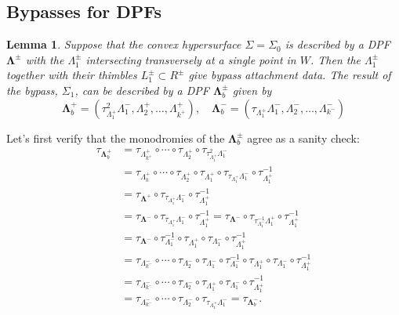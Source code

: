 \documentclass[11pt]{amsart}
\newcommand{\thicc}[1]{\pmb{#1}}
\newcommand{\posNegRegion}{R^{\pm}}
\newcommand{\Lag}{L}
\newcommand{\posNegLag}{\Lag^{\pm}}
\newcommand{\Leg}{\Lambda}
\newcommand{\posLeg}{\Leg^{+}}
\newcommand{\negLeg}{\Leg^{-}}
\newcommand{\thiccPosLeg}{\thicc{\Leg}^{+}}
\newcommand{\thiccNegLeg}{\thicc{\Leg}^{-}}
\newcommand{\thiccPosNegLeg}{\thicc{\Leg}^{\pm}}
\newcommand{\posNegLeg}{\Leg^{\pm}}
\newtheorem{lemma}[thm]{Lemma}
\begin{document}
\subsection{Bypasses for DPFs}

\begin{lemma}\label{Lemma:OBBypass}
Suppose that the convex hypersurface $\Sigma = \Sigma_{0}$ is described by a DPF $\thiccPosNegLeg$ with the $\posNegLeg_{1}$ intersecting transversely at a single point in $W$. Then the $\posNegLeg_{1}$ together with their thimbles $\posNegLag_{1} \subset \posNegRegion$ give bypass attachment data. The result of the bypass, $\Sigma_{1}$, can be described by a DPF $\thiccPosNegLeg_{b}$ given by
\begin{equation*}
\thiccPosLeg_{b} = (\tau_{\posLeg_{1}}^{2}\negLeg_{1}, \posLeg_{2}, \dots, \posLeg_{k^{+}}), \quad \thiccNegLeg_{b} = (\tau_{\posLeg_{1}}\negLeg_{1}, \negLeg_{2}, \dots, \negLeg_{k^{-}})
\end{equation*}
\end{lemma}

Let's first verify that the monodromies of the $\thiccPosNegLeg_{b}$ agree as a sanity check:
\begin{equation*}
\begin{aligned}
\tau_{\thiccPosLeg_{b}} &= \tau_{\posLeg_{k^{+}}} \circ \cdots \circ \tau_{\posLeg_{2}} \circ \tau_{\tau_{\posLeg_{1}}^{2}\negLeg_{1}} \\
&= \tau_{\posLeg_{k}} \circ \cdots \circ \tau_{\posLeg_{2}} \circ \tau_{\posLeg_{1}} \circ \tau_{\tau_{\posLeg_{1}}\negLeg_{1}} \circ \tau_{\posLeg_{1}}^{-1} \\
&=  \tau_{\thiccPosLeg} \circ \tau_{\tau_{\posLeg_{1}}\negLeg_{1}} \circ \tau_{\posLeg_{1}}^{-1}\\
&= \tau_{\thiccNegLeg} \circ \tau_{\tau_{\posLeg_{1}}\negLeg_{1}} \circ \tau_{\posLeg_{1}}^{-1}  = \tau_{\thiccNegLeg} \circ \tau_{\tau_{\negLeg_{1}}^{-1}\posLeg_{1}} \circ \tau_{\posLeg_{1}}^{-1}\\
&= \tau_{\thiccNegLeg} \circ \tau_{\negLeg_{1}}^{-1}\circ \tau_{\posLeg_{1}}\circ \tau_{\negLeg_{1}} \circ \tau_{\posLeg_{1}}^{-1}\\
&= \tau_{\negLeg_{k^{-}}}\circ \cdots \circ \tau_{\negLeg_{2}} \circ \tau_{\negLeg_{1}} \circ \tau_{\negLeg_{1}}^{-1}\circ \tau_{\posLeg_{1}}\circ \tau_{\negLeg_{1}} \circ \tau_{\posLeg_{1}}^{-1}\\
&= \tau_{\negLeg_{k^{-}}}\circ \cdots \circ \tau_{\negLeg_{2}} \circ \tau_{\posLeg_{1}}\circ \tau_{\negLeg_{1}} \circ \tau_{\posLeg_{1}}^{-1}\\
&= \tau_{\negLeg_{k^{-}}}\circ \cdots \circ \tau_{\negLeg_{2}} \circ \tau_{\tau_{\posLeg_{1}}\negLeg_{1}} = \tau_{\thiccNegLeg_{b}}.
\end{aligned}
\end{equation*}
\end{document}
